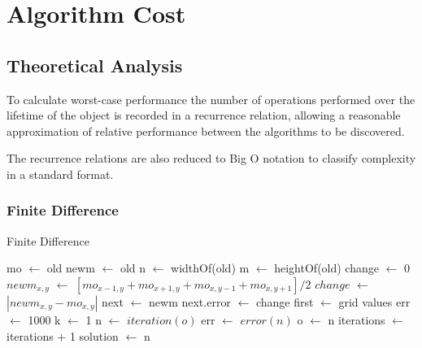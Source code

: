 \documentclass[aps,twocolumn,pre,nofootinbib,10pt]{revtex4-1}
\newcommand*\Let[2]{\State #1 $\gets$ #2}
\begin{document}
\section{Algorithm Cost}
\subsection{Theoretical Analysis}

To calculate worst-case performance the number of operations performed over the lifetime of the object is recorded in a recurrence relation, allowing a reasonable approximation of relative performance between the algorithms to be discovered.

The recurrence relations are also reduced to Big O notation to classify complexity in a standard format.

\subsubsection{Finite Difference}
\begin{algorithm}
    \caption{Finite Difference}
    \label{alg:fd}
    \begin{algorithmic}[1]
            \Let{mo}{old}
            \Let{newm}{old}
            \Let{n}{widthOf(old)}
            \Let{m}{heightOf(old)}
            \Let{change}{0}
                        \Let{$newm_{x,y}$}{$[{mo_{x-1,y}+mo_{x+1,y}+mo_{x,y-1}+mo_{x,y+1}}] / {2}$}
                    \EndIf
                        \Let{$change$}{$|newm_{x,y}-mo_{x,y}|$}
                    \EndIf
                \EndFor
            \EndFor
            \Let{next}{newm}
            \Let{next.error}{change}
            \State {}
        \EndFunction
            \Let{first}{grid values}
            \Let{err}{1000}
            \Let{k}{1}
                \Let{n}{$iteration(o)$}
                \Let{err}{$error(n)$}
                \Let{o}{n}
                \Let{iterations}{iterations + 1}
            \EndWhile
            \Let{solution}{n}
            \State {}
        \EndFunction
    \end{algorithmic}
\end{algorithm}
\end{document}

